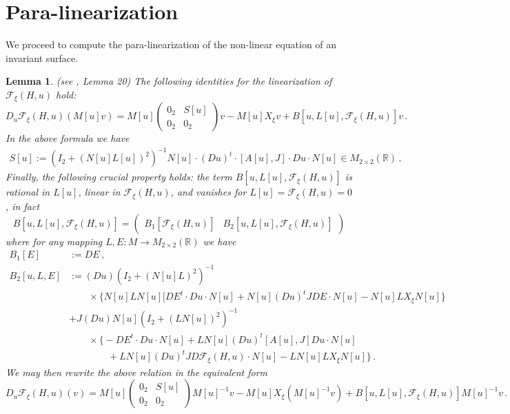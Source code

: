 \documentclass[11pt]{amsart}
\newcommand \R {{ \mathbb R}}
\newtheorem {lemma} [theorem]{Lemma}
\begin{document}
\section{Para-linearization}

We proceed to compute the para-linearization of the non-linear equation of an invariant surface.

\begin{lemma} 
\label{lemma:lin_id} 
(see  \cite{LGJV05}, Lemma 20) The following identities for the linearization of $\mathcal{F}_\xi(H, u)$ hold:
$$
D_u \mathcal{F}_\xi(H, u) (M[u] v)  =  M[u] \begin{pmatrix} 0_2 & S[u] \\ 0_2 & 0_2 \end{pmatrix} v - M[u] X_\xi v + B[u,L[u],\mathcal{F}_\xi(H, u)] v\,. 
$$
In the above formula we have
$$
\begin{aligned}
S[u]:=  (I_2 + (N[u] L[u])^2)^{-1} N[u] \cdot (Du)^t  \cdot [A[u], J] \cdot Du \cdot  N[u]  \in M_{2\times 2}(\R) \,.
\end{aligned}
$$
Finally, the following crucial property holds:  the term $B[u, L[u], \mathcal{F}_\xi(H, u)] $ is rational in $L[u]$, linear in  $\mathcal{F}_\xi(H, u)$, 
and vanishes for $ L[u] = \mathcal{F}_\xi(H, u)=0$, in fact 
$$
B [u, L[u], \mathcal{F}_\xi(H, u)]  = \begin{pmatrix} B_1[\mathcal{F}_\xi(H, u)]   & B_2[u, L[u], \mathcal{F}_\xi(H, u)]  \end{pmatrix} 
$$
where for any mapping $L, E : M \to M_{2\times 2}(\R)$ we have 
$$
\begin{aligned}
B_1[E] &:= DE \,, \\  
B_2[u,L, E]  &:= (Du) (I_2 + (N[u] L)^2)^{-1} \\ & \qquad \times \Big\{N[u]L N[u]  [DE^t  \cdot Du \cdot  N[u]    + N[u] (Du)^t J DE  \cdot N[u]  - N[u]L X_\xi N[u]  \Big\}  \\ &+ J (Du) N[u]  (I_2 + (L N[u])^2)^{-1} \\
&   \qquad \times \Big\{ -DE^t  \cdot Du \cdot  N[u]  + L N[u] (Du)^t  [A[u], J]  Du \cdot  N[u]  \\ & \qquad \qquad+ L N[u] (Du)^t J D\mathcal{F}_\xi(H, u)  \cdot N[u]    - LN[u]L X_\xi N[u]  \Big \} \,.
\end{aligned} 
$$
We may then rewrite the above relation in the equivalent form
$$
D_u \mathcal{F}_\xi(H, u) (v)  =  M[u] \begin{pmatrix} 0_2 & S[u] \\ 0_2 & 0_2 \end{pmatrix} M[u]^{-1} v - M[u] X_\xi (M[u]^{-1} v) + B[u,L[u], \mathcal{F}_\xi(H, u)    ] M[u]^{-1}v\,. 
$$
\end{lemma}
\end{document}
